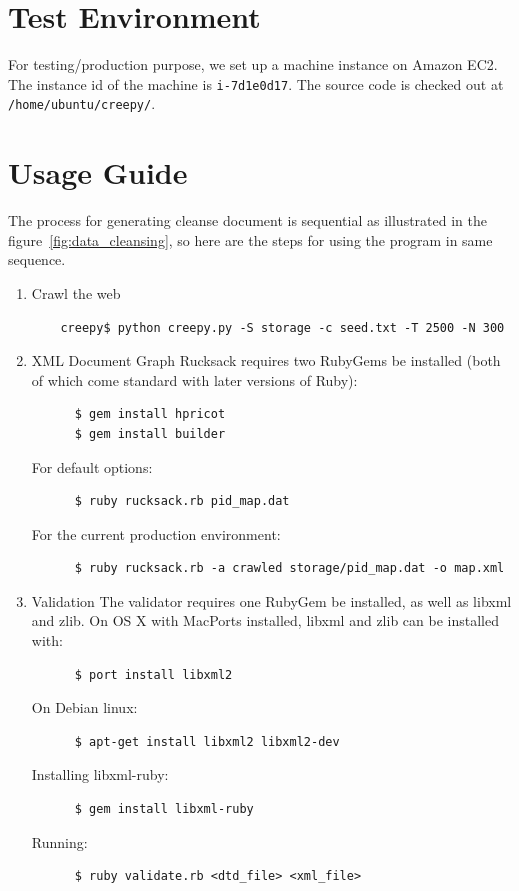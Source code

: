\documentclass[letterpaper,11pt,twoside]{article}
\begin{document}
\section{Test Environment}
For testing/production purpose, we set up a machine instance on Amazon EC2. The instance id of the machine is \texttt{i-7d1e0d17}. The source code is checked out at \texttt{/home/ubuntu/creepy/}.

\section{Usage Guide}
The process for generating cleanse document is sequential as illustrated in the figure~\ref{fig:data_cleansing}, so here are the steps for using the program in same sequence.

\begin{enumerate}
	\item Crawl the web	
	\begin{verbatim}
	creepy$ python creepy.py -S storage -c seed.txt -T 2500 -N 300
	\end{verbatim}
	
	\item XML Document Graph
	Rucksack requires two RubyGems be installed (both of which come standard with later versions of Ruby):
	\begin{verbatim}
	  $ gem install hpricot
	  $ gem install builder
	\end{verbatim}
	For default options:
	\begin{verbatim}
	  $ ruby rucksack.rb pid_map.dat
	\end{verbatim}
	For the current production environment:
	\begin{verbatim}
	  $ ruby rucksack.rb -a crawled storage/pid_map.dat -o map.xml
	\end{verbatim}
	
	\item Validation
	The validator requires one RubyGem be installed, as well as libxml and zlib.
	On OS X with MacPorts installed, libxml and zlib can be installed with:
	\begin{verbatim}
	  $ port install libxml2
	\end{verbatim}
	On Debian linux:
	\begin{verbatim}
	  $ apt-get install libxml2 libxml2-dev
	\end{verbatim}
	Installing libxml-ruby:
	\begin{verbatim}
	  $ gem install libxml-ruby
	\end{verbatim}
	Running:
	\begin{verbatim}
	  $ ruby validate.rb <dtd_file> <xml_file>
	\end{verbatim}
	

\end{enumerate}
\end{document}
